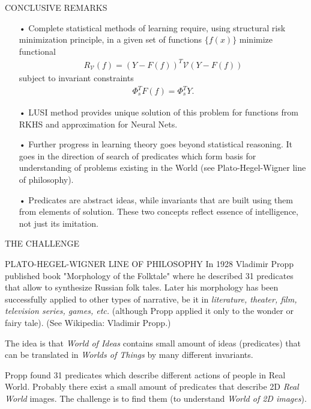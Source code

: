 \documentclass[11pt]{beamer}
\begin{document}
\begin{frame}{CONCLUSIVE REMARKS}
\begin{enumerate}
\item[•] Complete statistical methods of learning require, using structural risk minimization principle, in a given set of functions $\{f(x)\}$ minimize functional
\begin{align*}
R_{\mathcal{V}}(f) = (Y - F(f))^{T}\mathcal{V}(Y - F(f))
\end{align*}
subject to invariant constraints
\begin{align*}
\Phi_{s}^{T}F(f) = \Phi_{s}^{T}Y.
\end{align*}
\item[•] LUSI method provides unique solution of this problem for functions from RKHS and approximation for Neural Nets.
\item[•] Further progress in learning theory goes beyond statistical reasoning. It goes in the direction of search of predicates which form basis for understanding of problems existing in the World (see Plato-Hegel-Wigner line of philosophy).
\item[•] Predicates are abstract ideas, while invariants that are built using them from elements of solution. These two concepts reflect essence of intelligence, not just its imitation.
\end{enumerate}
\end{frame}

\begin{frame}{THE CHALLENGE}

\end{frame}


\begin{frame}{PLATO-HEGEL-WIGNER LINE OF PHILOSOPHY}
In 1928 Vladimir Propp published book "Morphology of the Folktale" where he described 31 predicates  that allow to synthesize Russian folk tales. Later his morphology has been successfully applied to other types of narrative, be it in \emph{literature, theater, film, television series, games, etc.} (although Propp applied it only to the wonder or fairy tale). (See Wikipedia: Vladimir Propp.) 

\hrulefill

The idea is that \emph{World of Ideas} contains small amount of ideas (predicates) that can be translated in \emph{Worlds of Things} by many different invariants.

\hrulefill

Propp found 31 predicates which describe different actions of people in Real World. Probably there exist a small amount of predicates that describe 2D \emph{Real World} images. The challenge is to find them (to understand \emph{World of 2D images}).
\end{frame}
\end{document}

